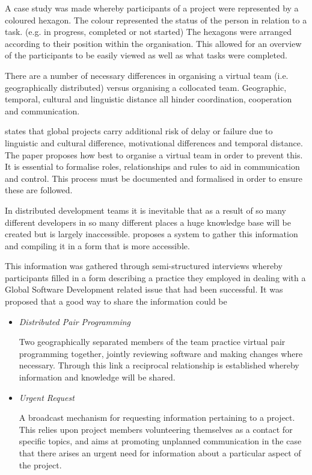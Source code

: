 \documentclass{l4proj}
\begin{document}
A case study was made whereby participants of a project were represented by a coloured hexagon.  The colour represented the status of the person in relation to a task. (e.g. in progress, completed or not started) The hexagons were arranged according to their position within the organisation.  This allowed for an overview of the participants to be easily viewed as well as what tasks were completed.

There are a number of necessary differences in organising a virtual team (i.e. geographically distributed) versus organising a collocated team.  Geographic, temporal, cultural and linguistic distance all hinder coordination, cooperation and communication. 

\citet{casey10virtual} states that global projects carry additional risk of delay or failure due to linguistic and cultural difference, motivational differences and temporal distance.  The paper proposes how best to organise a virtual team in order to prevent this.  It is essential to formalise roles, relationships and rules to aid in communication and control.  This process must be documented and formalised in order to ensure these are followed. 

In distributed development teams it is inevitable that as a result of so many different developers in so many different places a huge knowledge base will be created but is largely inaccessible.  \citet{bass07collaborative} proposes a system to gather this information and compiling it in a form that is more accessible.

This information was gathered through semi-structured interviews whereby participants filled in a form describing a practice they employed in dealing with a Global Software Development related issue that had been successful.  It was proposed that a good way to share the information could be

\begin{itemize}
\item \textit{Distributed Pair Programming} \par
Two geographically separated members of the team practice virtual pair programming together, jointly reviewing software and making changes where necessary.  Through this link a reciprocal relationship is established whereby information and knowledge will be shared.
\item\textit{Urgent Request} \par
A broadcast mechanism for requesting information pertaining to a project.  This relies upon project members volunteering themselves as a contact for specific topics, and aims at promoting unplanned communication in the case that there arises an urgent need for information about a particular aspect of the project.
\end{itemize}
\end{document}
